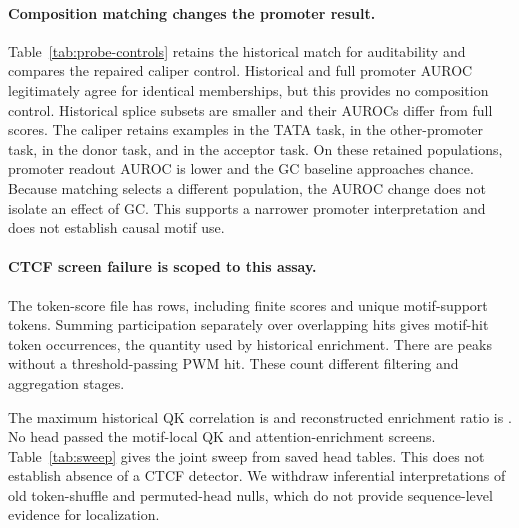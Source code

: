 \paragraph{Composition matching changes the promoter result.}
Table~\ref{tab:probe-controls} retains the historical match for auditability and compares the repaired caliper control. Historical and full promoter AUROC legitimately agree for identical memberships, but this provides no composition control. Historical splice subsets are smaller and their AUROCs differ from full scores. The caliper retains \CaliperTATACount{} examples in the TATA task, \CaliperOtherCount{} in the other-promoter task, \CaliperDonorCount{} in the donor task, and \CaliperAcceptorCount{} in the acceptor task. On these retained populations, promoter readout AUROC is lower and the GC baseline approaches chance. Because matching selects a different population, the AUROC change does not isolate an effect of GC. This supports a narrower promoter interpretation and does not establish causal motif use.
\begin{table}[t]
\centering\normalsize\setlength{\tabcolsep}{3pt}
\caption{Readout AUROC and 95\% sequence-bootstrap intervals. Full, historical, and caliper populations differ; retained counts and composition diagnostics accompany the predictions.}
\label{tab:probe-controls}
\ControlTable
\end{table}

\paragraph{CTCF screen failure is scoped to this assay.}
The token-score file has \TokenRows{} rows, including \FiniteTokens{} finite scores and \UniqueSupport{} unique motif-support tokens. Summing participation separately over overlapping hits gives \HitOccurrences{} motif-hit token occurrences, the quantity used by historical enrichment. There are \AbsentSequences{} peaks without a threshold-passing PWM hit. These count different filtering and aggregation stages.

The maximum historical QK correlation is \BestQK{} and reconstructed enrichment ratio is \BestEnrichment{}. No head passed the motif-local QK and attention-enrichment screens. Table~\ref{tab:sweep} gives the joint sweep from saved head tables. This does not establish absence of a CTCF detector. We withdraw inferential interpretations of old token-shuffle and permuted-head nulls, which do not provide sequence-level evidence for localization.
\begin{table}[t]
\centering\normalsize
\caption{Heads passing both descriptive cutoffs in the historical reconstructed-attention assay. No significance or confidence interval is assigned to a count of screened heads.}
\label{tab:sweep}
\ThresholdTable
\end{table}

